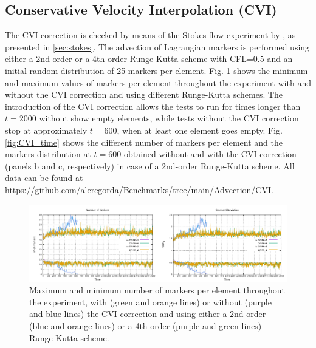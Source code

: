 \documentclass[hidelinks,10pt,a4paper]{article}
\begin{document}
\subsection{Conservative Velocity Interpolation (CVI)}\label{sec:CVI}
The CVI correction is checked by means of the Stokes flow experiment by \citet{Donea2003}, as presented in \ref{sec:stokes}. The advection of Lagrangian
markers is performed using either a 2nd-order or a 4th-order Runge-Kutta scheme with CFL=0.5 and an initial random distribution of 25 markers per element.
Fig. \ref{fig:CVI} shows the minimum and maximum values of markers per element throughout the experiment with and without the CVI correction and using
different Runge-Kutta schemes. The introduction of the CVI correction allows the
tests to run for times longer than $t=2000$ without show empty elements, while tests without the CVI correction stop at approximately $t=600$, when at least
one element goes empty. Fig. \ref{fig:CVI_time} shows the different number of markers per element and the markers distribution at $t=600$ obtained without and
with the CVI correction (panels b and c, respectively) in case of a 2nd-order Runge-Kutta scheme. All data can be found at
\url{https://github.com/aleregorda/Benchmarks/tree/main/Advection/CVI}.
\begin{figure}
\centering
\noindent\includegraphics[width=\textwidth]{./Figures/CVI.pdf}
\caption{Maximum and minimum number of markers per element throughout the experiment, with (green and orange lines) or without (purple and blue lines)
the CVI correction and using either a 2nd-order (blue and orange lines) or a 4th-order (purple and green lines) Runge-Kutta scheme.}
\label{fig:CVI}
\end{figure}
\end{document}
